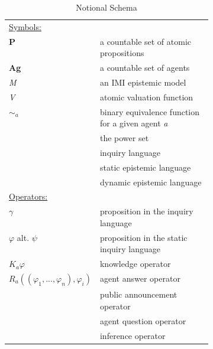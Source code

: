 \begin{table}[t]
	\caption{Notional Schema \label{notationalschema}}
	\begin{tabularx}{\linewidth}{p{0.40\linewidth}X}
		\toprule

		\multicolumn{2}{l}{{\underline{Symbols:}}}                                                             \\
		\textbf{P}                                  & a countable set of atomic propositions                   \\
		\textbf{Ag}                                 & a countable set of agents                                \\
		\textit{M}                                  & an IMI epistemic model                                   \\
		\textit{V}                                  & atomic valuation function                                \\
		$\sim_a$                                    & binary equivalence function for a given agent \textit{a} \\
		\textbf{\powset}                            & the power set                                            \\
		\oracle                                     & inquiry language                                         \\
		\staticlang                                 & static epistemic language                                \\
		\dynlang                                    & dynamic epistemic language                               \\

		\multicolumn{2}{l}{{\underline{Operators:}}}                                                           \\
		$\gamma$                                    & proposition in the inquiry language                      \\
		$\varphi$ alt. $\psi$                       & proposition in the static inquiry language               \\
		$K_a\varphi$                                & knowledge operator                                       \\
		$R_a((\varphi_1,...,\varphi_n), \varphi_i)$ & agent answer operator                                    \\
		\pubop                                      & public announcement operator                             \\
		\agquestop                                  & agent question operator                                  \\
		\infop                                      & inference operator                                       \\

		\bottomrule
	\end{tabularx}
\end{table}

